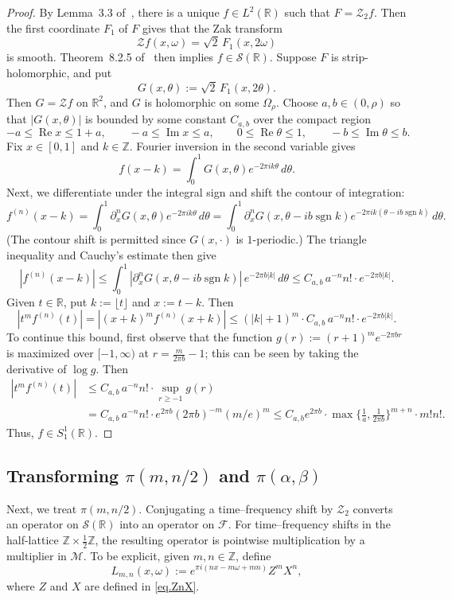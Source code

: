 \documentclass[10pt,a4paper]{amsart}
\newcommand{\R}{\mathbb{R}}
\newcommand{\Z}{\mathbb{Z}}
\newcommand{\Sch}{\mathcal{S}}
\newcommand{\Zak}{\mathcal{Z}}
\newcommand{\vZak}{\mathcal{Z}_2}
\begin{document}
\begin{proof}
By Lemma~3.3 of~\cite{FaulhuberPvC:26}, there is a unique
$f\in L^2(\R)$ such that $F=\vZak f$.  Then the first coordinate $F_1$ of $F$ gives that the Zak transform
\[
  \Zak f(x,\omega)=\sqrt2\,F_1(x,2\omega)
\]
is smooth. 
Theorem~8.2.5 of~\cite{Grochenig:01} then implies
$f\in\Sch(\R)$.
Suppose $F$ is strip-holomorphic, and put
\[
  G(x,\theta):=\sqrt2\,F_1(x,2\theta).
\]
Then $G=\Zak f$ on $\R^2$, and $G$ is holomorphic on some $\Omega_\rho$.
Choose $a,b\in(0,\rho)$ so that $|G(x,\theta)|$ is bounded by some constant $C_{a,b}$ over the compact region
\[
-a\leq\operatorname{Re}x\leq 1+a,
\qquad
-a\leq\operatorname{Im}x\leq a,
\qquad
0\leq\operatorname{Re}\theta\leq 1,
\qquad
-b\leq\operatorname{Im}\theta\leq b.
\]
Fix $x\in[0,1]$ and $k\in\Z$. 
Fourier inversion in the second variable gives
\[
  f(x-k)=\int_0^1G(x,\theta)e^{-2\pi i k\theta}\,d\theta.
\]
Next, we differentiate under the integral sign and shift the contour of integration:
\[
f^{(n)}(x-k)
=\int_0^1 \partial_x^nG(x,\theta)e^{-2\pi i k\theta}\,d\theta
=\int_{0}^{1} \partial_x^nG(x,\theta-ib\operatorname{sgn}k)e^{-2\pi i k(\theta-ib\operatorname{sgn}k)}\,d\theta.
\]
(The contour shift is permitted since $G(x,\cdot)$ is $1$-periodic.)
The triangle inequality and Cauchy's estimate then give
\[
|f^{(n)}(x-k)|
\leq\int_{0}^{1} |\partial_x^nG(x,\theta-ib\operatorname{sgn}k)|\,e^{-2\pi b|k|}\,d\theta
\leq C_{a,b}\,a^{-n}n!\cdot e^{-2\pi b|k|}.
\]
Given $t\in\mathbb{R}$, put $k:=\lfloor t\rfloor$ and $x:=t-k$.
Then
\[
|t^m f^{(n)}(t)|
=|(x+k)^m f^{(n)}(x+k)|
\leq (|k|+1)^m\cdot C_{a,b}\,a^{-n}n!\cdot e^{-2\pi b|k|}.
\]
To continue this bound, first observe that the function $g(r):=(r+1)^me^{-2\pi br}$ is maximized over $[-1,\infty)$ at $r=\frac{m}{2\pi b}-1$;
this can be seen by taking the derivative of $\log g$.
Then
\begin{align*}
|t^m f^{(n)}(t)|
&\leq C_{a,b}\,a^{-n}n!\cdot\sup_{r\geq-1}g(r)\\
&=C_{a,b}\,a^{-n}n!\cdot e^{2\pi b}(2\pi b)^{-m}(m/e)^m
\leq C_{a,b}e^{2\pi b}\cdot\max\{\tfrac{1}{a},\tfrac{1}{2\pi b}\}^{m+n}\cdot m!n!.
\end{align*}
Thus, $f\in S_1^1(\R)$.
\end{proof}

\subsection{Transforming $\pi(m,n/2)$ and $\pi(\alpha,\beta)$}

Next, we treat $\pi(m,n/2)$.
Conjugating a time--frequency shift by $\vZak$ converts an operator on $\Sch(\R)$ into an operator on $\mathcal{F}$.  For time--frequency shifts in the
half-lattice $\Z\times\tfrac12\Z$, the resulting operator is pointwise
multiplication by a multiplier in $\mathcal{M}$.  To be explicit, given $m,n\in\Z$, define
\begin{equation}\label{eq:Lmn}
  L_{m,n}(x,\omega)
  :=e^{\pi i(nx-m\omega+mn)}
  Z^mX^n,
\end{equation}
where $Z$ and $X$ are defined in \eqref{eq.ZnX}.
\end{document}
